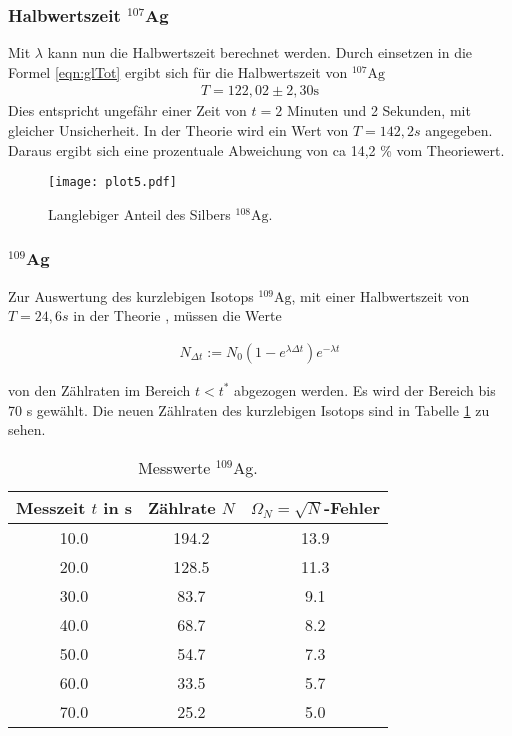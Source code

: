 \subsubsection{Halbwertszeit $^{107}$Ag}

Mit $\lambda$ kann nun die Halbwertszeit berechnet werden.
Durch einsetzen in die Formel \ref{eqn:glTot} ergibt sich für die Halbwertszeit von $^{107}\text{Ag}$ 
\begin{align*}
  T = 122,02 \pm 2,30 \text{s}
\end{align*}
Dies entspricht ungefähr einer Zeit von $t = 2$ Minuten und 2 Sekunden, mit gleicher Unsicherheit.
In der Theorie wird ein Wert von $T = 142,2 s$ \cite{Periode} angegeben.
Daraus ergibt sich eine prozentuale Abweichung von ca 14,2 \% vom Theoriewert.

\begin{figure}
  \centering
  \texttt{[image: plot5.pdf]}
  \caption{Langlebiger Anteil des Silbers $^{108}\text{Ag}$.}
  \label{fig:plot3}
\end{figure}
\FloatBarrier

\subsubsection{$^{109}$Ag}

Zur Auswertung des kurzlebigen Isotops $^{109}\text{Ag}$, mit einer Halbwertszeit von $T = 24,6 s$ in der Theorie \cite{Periode}, müssen die Werte 

\begin{align*}
  N_{\Delta t} := N_0(1-e^{\lambda \Delta t})e^{-\lambda t}
\end{align*}

von den Zählraten im Bereich $t < t^*$ abgezogen werden.
Es wird der Bereich bis 70 s gewählt.
Die neuen Zählraten des kurzlebigen Isotops sind in Tabelle \ref{tab:Nk} zu sehen. 

\begin{table}
  \centering
  \caption{Messwerte $^{109}$Ag.}
  \label{tab:Nk}
\begin{tabular}{c c c}
  \toprule
  Messzeit $t$ in s & Zählrate $N$ & $\Omega_N = \sqrt{N}$-Fehler\\
  \midrule
  10.0 & 194.2 & 13.9\\
  20.0 & 128.5 & 11.3 \\
  30.0 & 83.7 & 9.1 \\
  40.0 & 68.7 & 8.2 \\
  50.0 & 54.7 & 7.3 \\
  60.0 & 33.5 & 5.7 \\
  70.0 & 25.2 & 5.0 \\
  \bottomrule
\end{tabular}
\end{table}
\FloatBarrier

